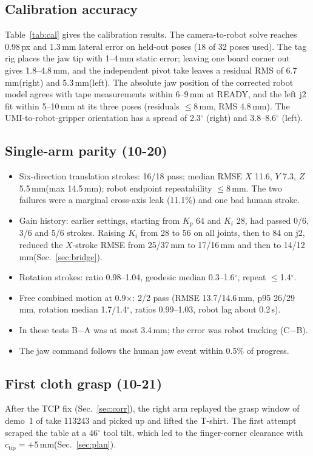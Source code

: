 \documentclass[conference,10pt]{IEEEtran}
\newcommand{\mm}{\,mm\xspace}
\begin{document}
\subsection{Calibration accuracy}\label{sec:rescal}
Table~\ref{tab:cal} gives the calibration results. The camera-to-robot solve reaches 0.98\,px and 1.3\mm lateral error on
held-out poses (18 of 32 poses used). The tag rig places the jaw tip with 1--4\mm static error; leaving one board corner
out gives 1.8--4.8\mm, and the independent pivot take leaves a residual RMS of 6.7\mm (right) and 5.3\mm (left). The
absolute jaw position of the corrected robot model agrees with tape measurements within 6--9\mm at READY, and the left
j2 fit within 5--10\mm at its three poses (residuals $\le$8\mm, RMS 4.8\mm). The UMI-to-robot-gripper orientation has a
spread of 2.3$^\circ$ (right) and 3.8--8.6$^\circ$ (left).

\subsection{Single-arm parity (10-20)}\label{sec:res1arm}
\begin{itemize}
\item Six-direction translation strokes: 16/18 pass; median RMSE $X$ 11.6, $Y$ 7.3, $Z$ 5.5\mm (max 14.5\mm); robot
  endpoint repeatability $\le$8\mm. The two failures were a marginal cross-axis leak (11.1\%) and one bad human stroke.
\item Gain history: earlier settings, starting from $K_p$ 64 and $K_i$ 28, had passed 0/6, 3/6 and 5/6 strokes. Raising
  $K_i$ from 28 to 56 on all joints, then to 84 on j2, reduced the $X$-stroke RMSE from 25/37\mm to 17/16\mm and then to
  14/12\mm (Sec.~\ref{sec:bridge}).
\item Rotation strokes: ratio 0.98--1.04, geodesic median 0.3--1.6$^\circ$, repeat $\le$1.4$^\circ$.
\item Free combined motion at 0.9$\times$: 2/2 pass (RMSE 13.7/14.6\mm, p95 26/29\mm, rotation median 1.7/1.4$^\circ$,
  ratios 0.99--1.03, robot lag about 0.2\,s).
\item In these tests B$-$A was at most 3.4\mm; the error was robot tracking (C$-$B).
\item The jaw command follows the human jaw event within 0.5\% of progress.
\end{itemize}

\subsection{First cloth grasp (10-21)}\label{sec:resgrasp}
After the TCP fix (Sec.~\ref{sec:corr}), the right arm replayed the grasp window of demo~1 of take 113243 and picked up and
lifted the T-shirt. The first attempt scraped the table at a 46$^\circ$ tool tilt, which led to the finger-corner clearance
with $c_\mathrm{tip}=+5$\mm (Sec.~\ref{sec:plan}).
\end{document}
